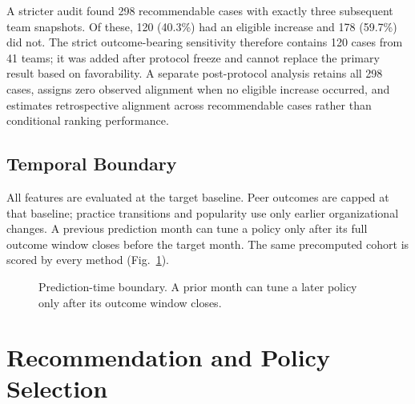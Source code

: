 \documentclass[runningheads]{llncs}
\begin{document}
A stricter audit found 298 recommendable cases with exactly three subsequent team snapshots. Of these, 120 (40.3\%) had an eligible increase and 178 (59.7\%) did not. The strict outcome-bearing sensitivity therefore contains 120 cases from 41 teams; it was added after protocol freeze and cannot replace the primary result based on favorability. A separate post-protocol analysis retains all 298 cases, assigns zero observed alignment when no eligible increase occurred, and estimates retrospective alignment across recommendable cases rather than conditional ranking performance.

\subsection{Temporal Boundary}

All features are evaluated at the target baseline. Peer outcomes are capped at that baseline; practice transitions and popularity use only earlier organizational changes. A previous prediction month can tune a policy only after its full outcome window closes before the target month. The same precomputed cohort is scored by every method (Fig.~\ref{fig:boundary}).

\begin{figure}[t]
\centering
{}
\caption{Prediction-time boundary. A prior month can tune a later policy only after its outcome window closes.}
\label{fig:boundary}
\end{figure}

\section{Recommendation and Policy Selection}
\end{document}
